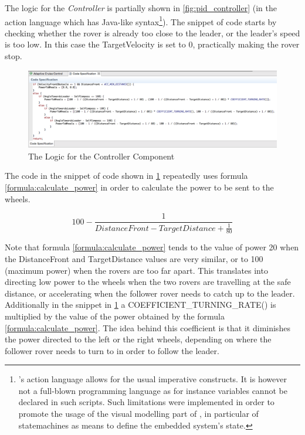 The logic for the \emph{Controller} is partially shown in
\fig\ref{fig:pid_controller} (in the \af action language which has Java-like syntax\footnote{\af 's action
language allows for the usual imperative constructs. It is however not a
full-blown programming language as for instance variables cannot be declared
in such scripts. Such limitations were implemented in order to promote the
usage of the visual modelling part of \af, in particular of statemachines as
means to define the embedded system's state.}).
The snippet of code starts by checking whether the rover is already too close to the
leader, or the leader's speed is too low. In this case the
\textsf{TargetVelocity} is set to \textsf{0}, practically making the rover stop.

\begin{figure}[!h]
\centering
\includegraphics[width=1\textwidth]{images/code_spec_controller.png}
\caption{The Logic for the Controller Component}
\label{fig:controller_logic}
\end{figure}

The code in the snippet of code shown in \fig\ref{fig:controller_logic}
repeatedly uses formula \ref{formula:calculate_power} in order to calculate the
power to be sent to the wheels.

\begin{equation}
100 - \frac{1}{DistanceFront - TargetDistance + \frac{1}{80}}
\label{formula:calculate_power}
\end{equation}

Note that formula \ref{formula:calculate_power} tends to the value of power 20
when the \textsf{DistanceFront} and \textsf{TargetDistance} values are
very similar, or to 100 (maximum power) when the rovers are too far apart. This
translates into directing low power to the wheels when the two rovers are travelling at the
safe distance, or accelerating when the follower rover needs to catch up to the
leader. Additionally in the snippet in \fig\ref{fig:controller_logic} a
\textsf{COEFFICIENT\_TURNING\_RATE()} is multiplied by the value of the power
obtained by the formula \ref{formula:calculate_power}. The idea behind this
coefficient is that it diminishes the power directed to the left or the right
wheels, depending on where the follower rover needs to turn to in order to
follow the leader.

